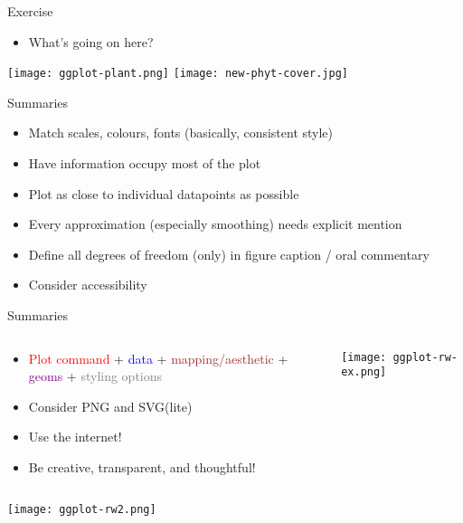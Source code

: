 \documentclass[10pt]{beamer}
\begin{document}
\begin{frame}{Exercise}
  \begin{itemize}
  \item What's going on here?
    \end{itemize}
  \texttt{[image: ggplot-plant.png]}   \texttt{[image: new-phyt-cover.jpg]}
\end{frame}

\begin{frame}{Summaries}
    \begin{itemize}
    \item Match scales, colours, fonts (basically, consistent style)
    \item Have information occupy most of the plot
    \item Plot as close to individual datapoints as possible
    \item Every approximation (especially smoothing) needs explicit mention
    \item Define all degrees of freedom (only) in figure caption / oral commentary
    \item Consider accessibility
    \end{itemize}
\end{frame}

\begin{frame}{Summaries}
  \begin{columns}
    \begin{column}{0.5\textwidth}
    \begin{itemize}
      \item \textcolor{red}{Plot command} + \textcolor{blue}{data} + \textcolor{brown}{mapping/aesthetic} + \textcolor{purple}{geoms} + \textcolor{gray}{styling options}
      \item Consider PNG and SVG(lite)
      \item Use the internet!
        \item Be creative, transparent, and thoughtful!
    \end{itemize}
    \end{column}
      \begin{column}{0.5\textwidth}
        \texttt{[image: ggplot-rw-ex.png]}
      \end{column}
  \end{columns}
  \centering
  \texttt{[image: ggplot-rw2.png]}
\end{frame}
\end{document}
